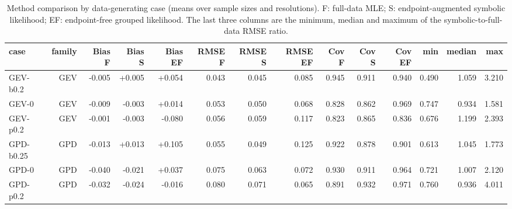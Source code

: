\begin{table}[t]
\centering
\small
\caption{Method comparison by data-generating case (means over sample sizes and resolutions). F: full-data MLE; S: endpoint-augmented symbolic likelihood; EF: endpoint-free grouped likelihood. The last three columns are the minimum, median and maximum of the symbolic-to-full-data RMSE ratio.}
\label{tab:sim-comp}
\begin{tabular}{lrrrrrrrrrrrrr}
\toprule
case & family & Bias F & Bias S & Bias EF & RMSE F & RMSE S & RMSE EF & Cov F & Cov S & Cov EF & min & median & max \\
\midrule
GEV-b0.2 & GEV & -0.005 & +0.005 & +0.054 & 0.043 & 0.045 & 0.085 & 0.945 & 0.911 & 0.940 & 0.490 & 1.059 & 3.210 \\
GEV-0 & GEV & -0.009 & -0.003 & +0.014 & 0.053 & 0.050 & 0.068 & 0.828 & 0.862 & 0.969 & 0.747 & 0.934 & 1.581 \\
GEV-p0.2 & GEV & -0.001 & -0.003 & -0.080 & 0.056 & 0.059 & 0.117 & 0.823 & 0.865 & 0.836 & 0.676 & 1.199 & 2.393 \\
GPD-b0.25 & GPD & -0.013 & +0.013 & +0.105 & 0.055 & 0.049 & 0.125 & 0.922 & 0.878 & 0.901 & 0.613 & 1.045 & 1.773 \\
GPD-0 & GPD & -0.040 & -0.021 & +0.037 & 0.075 & 0.063 & 0.072 & 0.930 & 0.911 & 0.964 & 0.721 & 1.007 & 2.120 \\
GPD-p0.2 & GPD & -0.032 & -0.024 & -0.016 & 0.080 & 0.071 & 0.065 & 0.891 & 0.932 & 0.971 & 0.760 & 0.936 & 4.011 \\
\bottomrule
\end{tabular}
\end{table}

